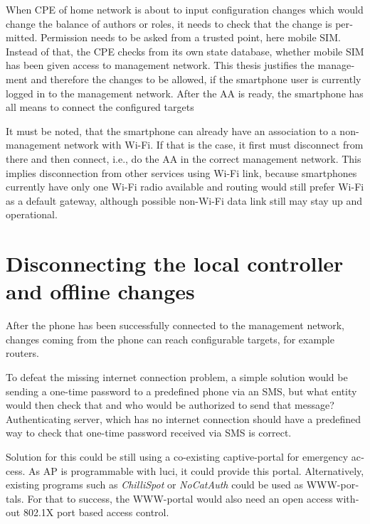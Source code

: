 \documentclass[12pt,a4paper,english]{tutthesis}
\begin{document}
\begin{otherlanguage}{english}
When CPE of home network is about to input configuration changes which
would change the balance of authors or roles, it needs to check that
the change is permitted.  Permission needs to be asked from a trusted
point, here mobile SIM. Instead of that, the CPE checks from its own
state database, whether mobile SIM has been given access to management
network.
This thesis justifies the management and therefore the changes to be
allowed, if the smartphone user is currently logged in to the
management network.
After the AA is ready, the smartphone has all means to connect the
configured targets

It must be noted, that the smartphone can already have an association
to a non-management network with Wi-Fi. If that is the case, it first
must disconnect from there and then connect, i.e., do the  AA in the correct management
network. This implies disconnection from other services using Wi-Fi
link, because smartphones currently have only one Wi-Fi radio
available and routing would still prefer Wi-Fi as a default gateway, although
possible non-Wi-Fi data link still may stay up and operational.
\section{Disconnecting the local controller and offline changes}
\label{sec-4-6}
\label{sec:disconnections}


After the phone has been successfully connected to the management
network, changes coming from the phone can reach configurable targets,
for example routers.  















To defeat the missing internet connection problem, a simple solution would be
sending a one-time password to a predefined phone via an SMS, but what
entity would then check that and who would be authorized to send that message?
Authenticating server, which has no internet connection should 
have a predefined way to check that one-time password received via SMS is correct.

Solution for this could be still using a co-existing captive-portal
for emergency access. As AP is programmable with luci, it could
provide this portal.  Alternatively, existing programs such as
\emph{ChilliSpot} or \emph{NoCatAuth} could be used as WWW-portals.  For that to
success, the WWW-portal would also need an open access without 802.1X
port based access control.


\end{otherlanguage}
\end{document}
